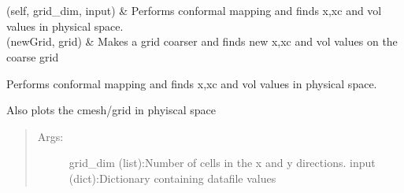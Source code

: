 \documentclass[letterpaper,10pt,english]{sphinxmanual}
\begin{document}
\begin{savenotes}\sphinxatlongtablestart\begin{longtable}[c]{}
\hline

\endfirsthead

%
{}\\
\hline

\endhead

\hline
{}\\
\endfoot

\endlastfoot

\sphinxAtStartPar
{\hyperref[\detokenize{autoapi/airfoil_map/index:airfoil_map.init_from_file}]{}}(self, grid\_dim, input)
&
\sphinxAtStartPar
Performs conformal mapping and finds x,xc and vol values in physical space.
\\
\hline
\sphinxAtStartPar
{\hyperref[\detokenize{autoapi/airfoil_map/index:airfoil_map.init_from_grid}]{}}(newGrid, grid)
&
\sphinxAtStartPar
Makes a grid coarser and finds new x,xc and vol values on the coarse grid
\\
\hline
\end{longtable}\sphinxatlongtableend\end{savenotes}

\begin{fulllineitems}
\label{\detokenize{autoapi/airfoil_map/index:airfoil_map.init_from_file}}
\sphinxAtStartPar
Performs conformal mapping and finds x,xc and vol values in physical space.

\sphinxAtStartPar
Also plots the c\sphinxhyphen{}mesh/grid in phyiscal space
\begin{quote}
\begin{description}
\item[{Args:}] \leavevmode
\sphinxAtStartPar
grid\_dim (list):Number of cells in the x and y directions.
input (dict):Dictionary containing data\sphinxhyphen{}file values

\end{description}
\end{quote}

\end{fulllineitems}
\end{document}
